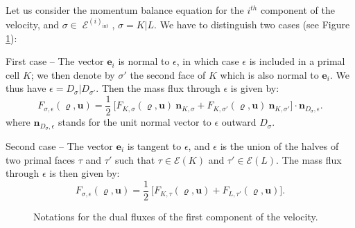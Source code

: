 \documentclass{amsart}
\numberwithin{equation}{section}
\begin{document}
\medskip
Let us consider the momentum balance equation for the $i^{th}$ component of the velocity, and ${{\sigma}} \in \operatorname{{\mathcal{E}}}^{(i)}_\operatorname{int}$, ${{\sigma}}=K|L$.
We have to distinguish two cases (see Figure \ref{figdualflux}):
\begin{list}{-}{\itemsep=0.ex \topsep=0.5ex    }
\item First case -- The vector ${{\boldsymbol e}}_i$ is normal to ${\epsilon}$, in which case ${\epsilon}$ is included in a primal cell $K$; we then denote by ${{\sigma}}'$ the second face of $K$ which is also normal to ${{\boldsymbol e}}_i$.
We thus have ${\epsilon}=D_{{\sigma}} | D_{{{\sigma}}'}$.
Then the mass flux through ${\epsilon}$ is given by:
\begin{equation}\label{eq:flux_eK}
F_{{{\sigma}},{\epsilon}}({\varrho}, {{\boldsymbol u}})  = \frac 1 2 \ \bigl[ F_{K,{{\sigma}}}({\varrho},{{\boldsymbol u}})\ {{\boldsymbol n}}_{K,{{\sigma}}} 
+ F_{K,{{\sigma}}'}({\varrho},{{\boldsymbol u}})\ {{\boldsymbol n}}_{K,{{\sigma}}'}  \bigr] \cdot {{\boldsymbol n}}_{D_{{\sigma}},{\epsilon}}.
\end{equation}
where  ${\bm{n}}_{D_{{\sigma}},{\epsilon}} $  stands for the unit normal vector to ${\epsilon}$ outward $D_{{\sigma}}$. 
\item  Second case -- The vector ${{\boldsymbol e}}_{i}$ is tangent to ${\epsilon}$, and ${\epsilon}$ is the union of the halves of two
primal faces ${\tau}$ and ${\tau}'$ such that ${\tau}\in {{\mathcal E}}(K)$ and ${\tau}' \in {{\mathcal E}}(L)$.
The mass flux through ${\epsilon}$ is then given by:
\begin{equation}\label{eq:flux_eorth}
F_{{{\sigma}},{\epsilon}}({\varrho}, {{\boldsymbol u}})  = \frac 1 2\ \bigl[F_{K,{\tau}}({\varrho},{{\boldsymbol u}})+ F_{L,{\tau}'}({\varrho},{{\boldsymbol u}}) \bigr].
\end{equation}
\end{list}
\begin{figure}[htb]\label{figdualflux}
\centering
{}
\caption{Notations for the dual fluxes of the first component of the velocity.}
\end{figure}
\end{document}
